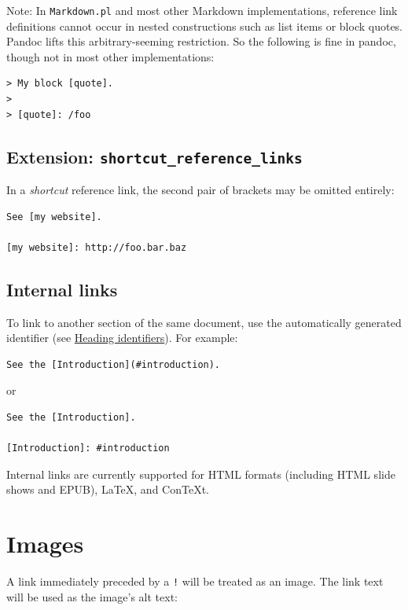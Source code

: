 \documentclass[
  b5paper
]{book}
\begin{document}
Note: In \texttt{Markdown.pl} and most other Markdown implementations,
reference link definitions cannot occur in nested constructions such as
list items or block quotes. Pandoc lifts this arbitrary-seeming
restriction. So the following is fine in pandoc, though not in most
other implementations:

\begin{verbatim}
> My block [quote].
>
> [quote]: /foo
\end{verbatim}

\subsection{\texorpdfstring{Extension:
\texttt{shortcut\_reference\_links}}{Extension: shortcut\_reference\_links}}\label{extension-shortcut_reference_links}

In a \emph{shortcut} reference link, the second pair of brackets may be
omitted entirely:

\begin{verbatim}
See [my website].

[my website]: http://foo.bar.baz
\end{verbatim}

\subsection{Internal links}\label{internal-links}

To link to another section of the same document, use the automatically
generated identifier (see \hyperref[heading-identifiers]{Heading
identifiers}). For example:

\begin{verbatim}
See the [Introduction](#introduction).
\end{verbatim}

or

\begin{verbatim}
See the [Introduction].

[Introduction]: #introduction
\end{verbatim}

Internal links are currently supported for HTML formats (including HTML
slide shows and EPUB), LaTeX, and ConTeXt.

\section{Images}\label{images}

A link immediately preceded by a \texttt{!} will be treated as an image.
The link text will be used as the image's alt text:
\end{document}
